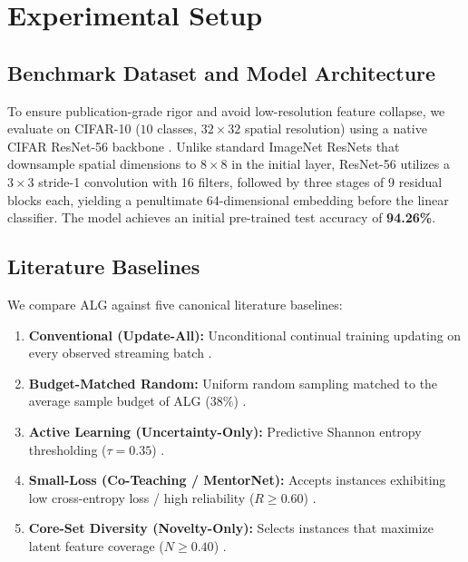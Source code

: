 \documentclass[journal,10pt,twocolumn]{article}
\begin{document}
\section{Experimental Setup}
\subsection{Benchmark Dataset and Model Architecture}
To ensure publication-grade rigor and avoid low-resolution feature collapse, we evaluate on CIFAR-10 ($10$ classes, $32 \times 32$ spatial resolution) using a native CIFAR ResNet-56 backbone \cite{he2016deep}. Unlike standard ImageNet ResNets that downsample spatial dimensions to $8 \times 8$ in the initial layer, ResNet-56 utilizes a $3 \times 3$ stride-1 convolution with 16 filters, followed by three stages of 9 residual blocks each, yielding a penultimate 64-dimensional embedding before the linear classifier. The model achieves an initial pre-trained test accuracy of \textbf{94.26\%}.

\subsection{Literature Baselines}
We compare ALG against five canonical literature baselines:
\begin{enumerate}
    \item \textbf{Conventional (Update-All):} Unconditional continual training updating on every observed streaming batch \cite{lange2022continual}.
    \item \textbf{Budget-Matched Random:} Uniform random sampling matched to the average sample budget of ALG ($38\%$) \cite{settles2009active}.
    \item \textbf{Active Learning (Uncertainty-Only):} Predictive Shannon entropy thresholding ($\tau = 0.35$) \cite{lewis1994sequential}.
    \item \textbf{Small-Loss (Co-Teaching / MentorNet):} Accepts instances exhibiting low cross-entropy loss / high reliability ($R \ge 0.60$) \cite{han2018coteaching,jiang2018mentornet}.
    \item \textbf{Core-Set Diversity (Novelty-Only):} Selects instances that maximize latent feature coverage ($N \ge 0.40$) \cite{sener2018active}.
\end{enumerate}
\end{document}
